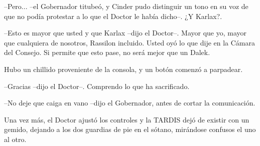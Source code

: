 --Pero... --el Gobernador titubeó, y Cinder pudo distinguir un tono en su voz de que no podía protestar a lo que el Doctor le había dicho--. ¿Y Karlax?.



--Esto es mayor que usted y que Karlax --dijo el Doctor--. Mayor que yo, mayor que cualquiera de nosotros, Rassilon incluido. Usted oyó lo que dije en la Cámara del Consejo. Si permite que esto pase, no será mejor que un Dalek.



Hubo un chillido proveniente de la consola, y un botón comenzó a parpadear.



--Gracias --dijo el Doctor--. Comprendo lo que ha sacrificado.



--No deje que caiga en vano --dijo el Gobernador, antes de cortar la comunicación.



Una vez más, el Doctor ajustó los controles y la TARDIS dejó de existir con un gemido, dejando a los dos guardias de pie en el sótano, mirándose confusos el uno al otro.







